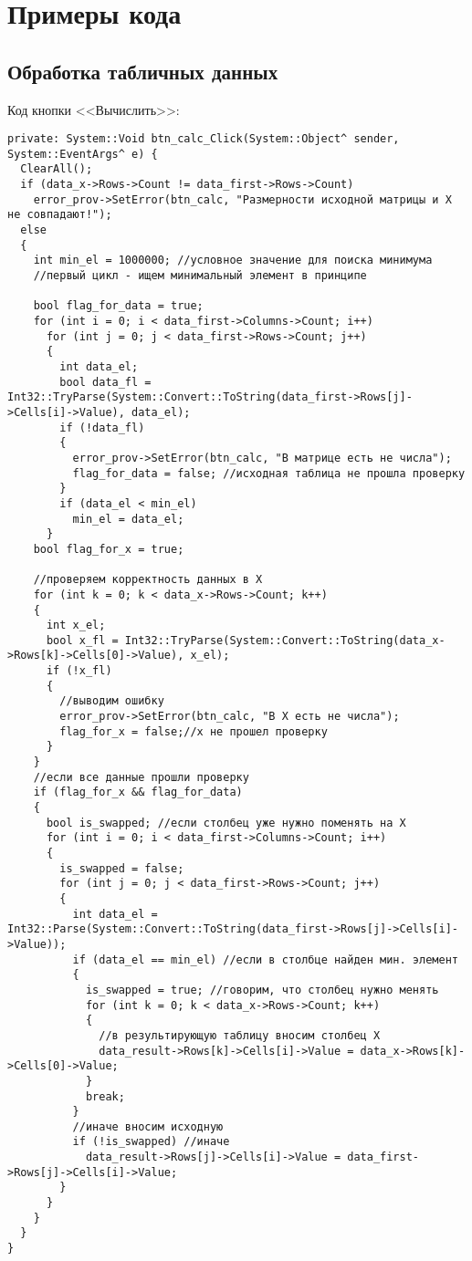 \section{Примеры кода} \label{app:codes}
\subsection*{Обработка табличных данных}
Код кнопки <<Вычислить>>:
\begin{verbatim}
private: System::Void btn_calc_Click(System::Object^ sender, System::EventArgs^ e) {
  ClearAll();
  if (data_x->Rows->Count != data_first->Rows->Count)
    error_prov->SetError(btn_calc, "Размерности исходной матрицы и X не совпадают!");
  else
  {
    int min_el = 1000000; //условное значение для поиска минимума
    //первый цикл - ищем минимальный элемент в принципе

    bool flag_for_data = true;
    for (int i = 0; i < data_first->Columns->Count; i++)
      for (int j = 0; j < data_first->Rows->Count; j++)
      {
        int data_el;
        bool data_fl = Int32::TryParse(System::Convert::ToString(data_first->Rows[j]->Cells[i]->Value), data_el);
        if (!data_fl)
        {
          error_prov->SetError(btn_calc, "В матрице есть не числа");
          flag_for_data = false; //исходная таблица не прошла проверку
        }
        if (data_el < min_el)
          min_el = data_el;
      }
    bool flag_for_x = true;

    //проверяем корректность данных в X
    for (int k = 0; k < data_x->Rows->Count; k++)
    {
      int x_el;
      bool x_fl = Int32::TryParse(System::Convert::ToString(data_x->Rows[k]->Cells[0]->Value), x_el);
      if (!x_fl)
      {
        //выводим ошибку
        error_prov->SetError(btn_calc, "В X есть не числа");
        flag_for_x = false;//x не прошел проверку
      }
    }
    //если все данные прошли проверку
    if (flag_for_x && flag_for_data)
    {
      bool is_swapped; //если столбец уже нужно поменять на Х
      for (int i = 0; i < data_first->Columns->Count; i++)
      {
        is_swapped = false;
        for (int j = 0; j < data_first->Rows->Count; j++)
        {
          int data_el = Int32::Parse(System::Convert::ToString(data_first->Rows[j]->Cells[i]->Value));
          if (data_el == min_el) //если в столбце найден мин. элемент
          {
            is_swapped = true; //говорим, что столбец нужно менять
            for (int k = 0; k < data_x->Rows->Count; k++)
            {
              //в результирующую таблицу вносим столбец Х
              data_result->Rows[k]->Cells[i]->Value = data_x->Rows[k]->Cells[0]->Value;
            }
            break;
          }
          //иначе вносим исходную
          if (!is_swapped) //иначе
            data_result->Rows[j]->Cells[i]->Value = data_first->Rows[j]->Cells[i]->Value;
        }
      }
    }
  }
}
\end{verbatim}
